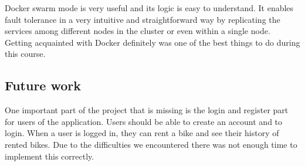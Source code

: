 Docker swarm mode is very useful and its logic is easy to understand. It enables fault tolerance in a very intuitive and straightforward way by replicating the services among different nodes in the cluster or even within a single node. Getting acquainted with Docker definitely was one of the best things to do during this course. 

\subsection{Future work}
One important part of the project that is missing is the login and register part for users of the application. Users should be able to create an account and to login. When a user is logged in, they can rent a bike and see their history of rented bikes. Due to the difficulties we encountered there was not enough time to implement this correctly.
